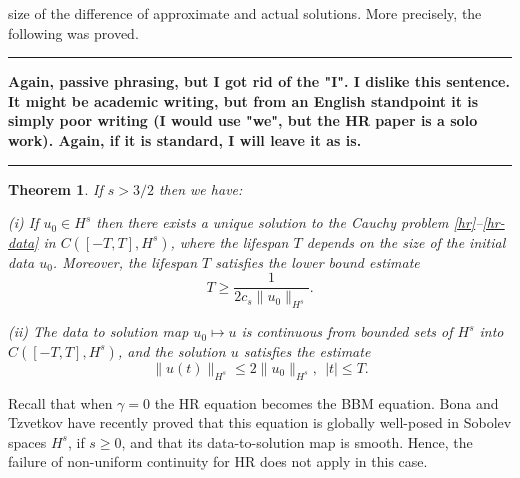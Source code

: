 \documentclass[12pt,reqno]{amsart}
\newtheorem{theorem}{Theorem}
\begin{document}
size of the difference of approximate and actual solutions. More precisely, 
the following was proved. 
\hrule
\textbf{Again, passive phrasing, but I got rid of the "I". I dislike this sentence. It might be academic writing,
    but from an English standpoint it is simply poor writing (I would use "we", but the HR paper is a solo work). Again, if it is standard, I will leave it as is.}
\hrule
\begin{theorem}
\label{thm:HR_existence_continuous_dependence}
If   $s>3/2$  then we have:

(i) If $u_0\in H^s$  then  there exists a unique solution to
the Cauchy problem  \eqref{hr}--\eqref{hr-data} in $C([-T, T], H^s)$, where 
the lifespan  $T$ depends on the size
of the initial data $u_0$. Moreover, 
the  lifespan $T$ satisfies the lower bound estimate 
%
%
%
\begin{equation}
\label{Life-span-est}
T
\ge
\frac{1}{2c_s \|u_0\|_{H^s}}.
\end{equation}
%

(ii)
The data to solution map $u_0 \mapsto u$ is continuous from
bounded sets of $H^s$ into \\ $C([-T, T], H^s)$,
and the solution $u$ satisfies the estimate
%
%
%
\begin{equation}
\label{u_x-Linfty-Hs}
\|
u(t)
\|_ {H^s}
\le
2
\|
u_0
\|_{H^s}, \ \ |t|\le T.
\end{equation}
%
%
%
\end{theorem}

Recall that when  $\gamma=0$ the HR equation becomes the BBM
equation.  Bona and Tzvetkov \cite{Bona_2009_Sharp-well-pose} have recently
proved  that this equation  is globally well-posed in  Sobolev spaces $H^s$, if
$s \ge 0$, and that its data-to-solution map is smooth. Hence, the failure of
non-uniform continuity for HR does not apply in this case. 
\end{document}
